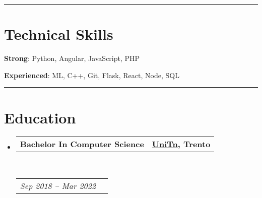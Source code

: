 \documentclass[10pt,a4paper,hidelinks]{article}
\makeatletter
\newenvironment{indentsection}[1]%
{\begin{list}{}%
	{\setlength{\leftmargin}{#1}}%
	\item[]%
}
{\end{list}}
\newcommand{\headerrow}[2]
{\begin{tabular*}{\linewidth}{l@{\extracolsep{\fill}}r}
	#1 &
	#2 \\
\end{tabular*}}
\makeatother
\begin{document}

{\color{IFMediumGreen} \hrule}
\vspace{-0.3em}
{\color{IFDarkGreen}\section*{Technical Skills}}

\begin{indentsection}{\parindent}
\begin{flushleft}
    \textbf{Strong}: Python, Angular, JavaScript, PHP
\end{flushleft}
\vspace{-1.0em}
\begin{flushleft}
    \textbf{Experienced}: ML, C++, Git, Flask, React, Node, SQL
\end{flushleft}
\end{indentsection}



{\color{IFMediumGreen} \hrule}
\vspace{-0.3em}
{\color{IFDarkGreen}\section*{Education}}

\begin{itemize}
	\parskip=0.1em

	\item 
	\headerrow
		{\textbf{Bachelor In Computer Science}}
		{\textbf{\colorbox{IFLightGreen!30}{\href{https://www.unitn.it/}{\textbf{UniTn}}}{, Trento}}}
	\\
	\headerrow
		{\emph{Sep 2018 -- Mar 2022}}
		{\emph{}}

\end{itemize}


\end{document}
